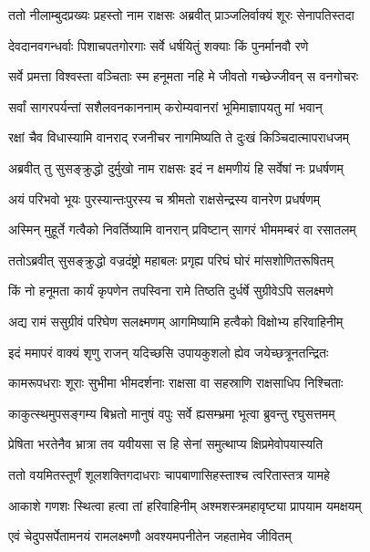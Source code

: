 
\twolineshloka
{ततो नीलाम्बुदप्रख्यः प्रहस्तो नाम राक्षसः}
{अब्रवीत् प्राञ्जलिर्वाक्यं शूरः सेनापतिस्तदा} %

\twolineshloka
{देवदानवगन्धर्वाः पिशाचपतगोरगाः}
{सर्वे धर्षयितुं शक्याः किं पुनर्मानवौ रणे} %

\twolineshloka
{सर्वे प्रमत्ता विश्वस्ता वञ्चिताः स्म हनूमता}
{नहि मे जीवतो गच्छेज्जीवन् स वनगोचरः} %

\twolineshloka
{सर्वां सागरपर्यन्तां सशैलवनकाननाम्}
{करोम्यवानरां भूमिमाज्ञापयतु मां भवान्} %

\twolineshloka
{रक्षां चैव विधास्यामि वानराद् रजनीचर}
{नागमिष्यति ते दुःखं किञ्चिदात्मापराधजम्} %

\twolineshloka
{अब्रवीत् तु सुसङ्क्रुद्धो दुर्मुखो नाम राक्षसः}
{इदं न क्षमणीयं हि सर्वेषां नः प्रधर्षणम्} %

\twolineshloka
{अयं परिभवो भूयः पुरस्यान्तःपुरस्य च}
{श्रीमतो राक्षसेन्द्रस्य वानरेण प्रधर्षणम्} %

\twolineshloka
{अस्मिन् मुहूर्ते गत्वैको निवर्तिष्यामि वानरान्}
{प्रविष्टान् सागरं भीममम्बरं वा रसातलम्} %

\twolineshloka
{ततोऽब्रवीत् सुसङ्क्रुद्धो वज्रदंष्ट्रो महाबलः}
{प्रगृह्य परिघं घोरं मांसशोणितरूषितम्} %

\twolineshloka
{किं नो हनूमता कार्यं कृपणेन तपस्विना}
{रामे तिष्ठति दुर्धर्षे सुग्रीवेऽपि सलक्ष्मणे} %

\twolineshloka
{अद्य रामं ससुग्रीवं परिघेण सलक्ष्मणम्}
{आगमिष्यामि हत्वैको विक्षोभ्य हरिवाहिनीम्} %

\twolineshloka
{इदं ममापरं वाक्यं शृणु राजन् यदिच्छसि}
{उपायकुशलो ह्येव जयेच्छत्रूनतन्द्रितः} %

\twolineshloka
{कामरूपधराः शूराः सुभीमा भीमदर्शनाः}
{राक्षसा वा सहस्राणि राक्षसाधिप निश्चिताः} %

\twolineshloka
{काकुत्स्थमुपसङ्गम्य बिभ्रतो मानुषं वपुः}
{सर्वे ह्यसम्भ्रमा भूत्वा ब्रुवन्तु रघुसत्तमम्} %

\twolineshloka
{प्रेषिता भरतेनैव भ्रात्रा तव यवीयसा}
{स हि सेनां समुत्थाप्य क्षिप्रमेवोपयास्यति} %

\twolineshloka
{ततो वयमितस्तूर्णं शूलशक्तिगदाधराः}
{चापबाणासिहस्ताश्च त्वरितास्तत्र यामहे} %

\twolineshloka
{आकाशे गणशः स्थित्वा हत्वा तां हरिवाहिनीम्}
{अश्मशस्त्रमहावृष्ट्या प्रापयाम यमक्षयम्} %

\twolineshloka
{एवं चेदुपसर्पेतामनयं रामलक्ष्मणौ}
{अवश्यमपनीतेन जहतामेव जीवितम्} %

